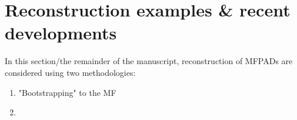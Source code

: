 \section{Reconstruction examples & recent developments}

In this section/the remainder of the manuscript, reconstruction of MFPADs are considered using two methodologies:

\begin{enumerate}
\item "Bootstrapping" to the MF
\item 
\end{enumerate}